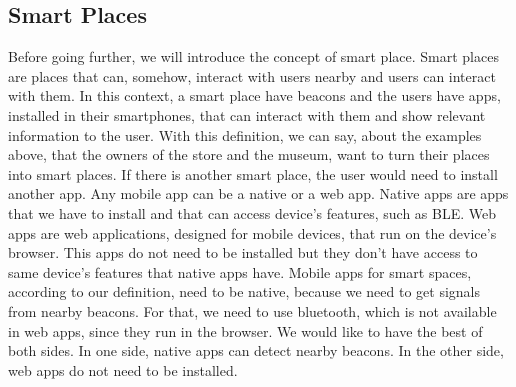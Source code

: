\subsection{Smart Places}
\label{sub:smart_places}
Before going further, we will introduce the concept of
smart place. Smart places are places that can, somehow,
interact with users nearby and users can interact 
with them.
In this context, a smart place have beacons and the users
have apps, installed in their smartphones, that can interact
with them and show relevant information to the user.
With this definition, we can say, about the examples above,
that the owners of the store and the museum, want to
turn their places into smart places.
If there is another smart place, the user would need to
install another app.
Any mobile app can be a native or a web app. Native apps
are apps that we have to install and that can access
device's features, such as BLE. Web apps are web
applications, designed for mobile devices, that run
on the device's browser. This apps do not need to be
installed but they don't have access
to same device's features that native apps have.
Mobile apps for smart spaces, according to our definition,
need to be native, because we need to get signals from
nearby beacons. For that, we need to use bluetooth, which is
not available in web apps, since they run in the browser.
We would like to have the best of both sides. In one side,
native apps can detect nearby beacons. In the other side,
web apps do not need to be installed.

